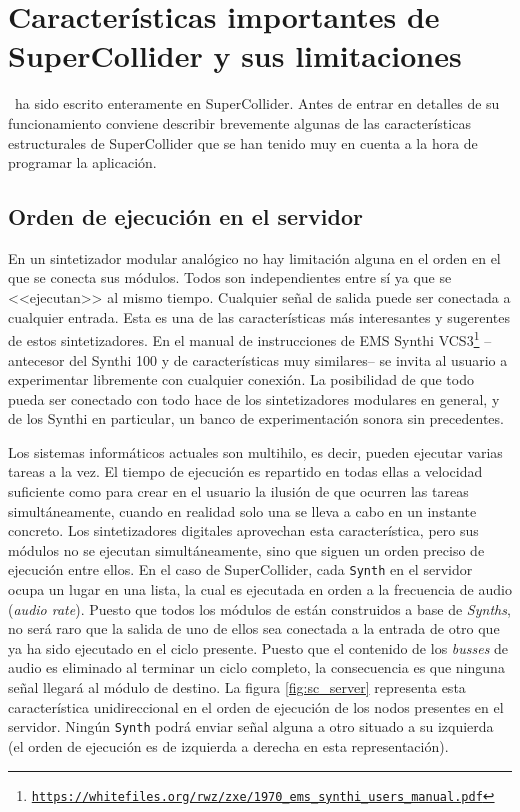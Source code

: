 \section[Características de SuperCollider]{Características importantes de SuperCollider y sus limitaciones}
\label{sec:sc_features}

\appName~ha sido escrito enteramente en SuperCollider. Antes de entrar en detalles de su funcionamiento conviene describir brevemente algunas de las características estructurales de SuperCollider que se han tenido muy en cuenta a la hora de programar la aplicación.

\subsection{Orden de ejecución en el servidor}
En un sintetizador modular analógico no hay limitación alguna en el orden en el que se conecta sus módulos. Todos son independientes entre sí ya que se <<ejecutan>> al mismo tiempo. Cualquier señal de salida puede ser conectada a cualquier entrada. Esta es una de las características más interesantes y sugerentes de estos sintetizadores. En el manual de instrucciones de EMS Synthi VCS3\footnote{\href{https://whitefiles.org/rwz/zxe/1970\_ems\_synthi\_users\_manual.pdf}{\texttt{https://whitefiles.org/rwz/zxe/1970\_ems\_synthi\_users\_manual.pdf}}} --antecesor del Synthi 100 y de características muy similares-- se invita al usuario a experimentar libremente con cualquier conexión. La posibilidad de que todo pueda ser conectado con todo hace de los sintetizadores modulares en general, y de los Synthi en particular, un banco de experimentación sonora sin precedentes.

Los sistemas informáticos actuales son multihilo, es decir, pueden ejecutar varias tareas a la vez. El tiempo de ejecución es repartido en todas ellas a velocidad suficiente como para crear en el usuario la ilusión de que ocurren las tareas simultáneamente, cuando en realidad solo una se lleva a cabo en un instante concreto. Los sintetizadores digitales aprovechan esta característica, pero sus módulos no se ejecutan simultáneamente, sino que siguen un orden preciso de ejecución entre ellos. En el caso de SuperCollider, cada \texttt{Synth} en el servidor ocupa un lugar en una lista, la cual es ejecutada en orden a la frecuencia de audio (\textit{audio rate}). Puesto que todos los módulos de \appName están construidos a base de \textit{Synths}, no será raro que la salida de uno de ellos sea conectada a la entrada de otro que ya ha sido ejecutado en el ciclo presente. Puesto que el contenido de los \textit{busses} de audio es eliminado al terminar un ciclo completo, la consecuencia es que ninguna señal llegará al módulo de destino. La figura \ref{fig:sc_server} representa esta característica unidireccional en el orden de ejecución de los nodos presentes en el servidor. Ningún \texttt{Synth} podrá enviar señal alguna a otro situado a su izquierda (el orden de ejecución es de izquierda a derecha en esta representación).

